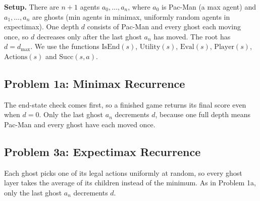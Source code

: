 \documentclass[11pt,a4paper]{article}
\begin{document}
\noindent\textbf{Setup.} There are $n+1$ agents $a_0, \dots, a_n$, where $a_0$ is Pac-Man (a max agent) and $a_1, \dots, a_n$ are ghosts (min agents in minimax, uniformly random agents in expectimax). One depth $d$ consists of Pac-Man and every ghost each moving once, so $d$ decreases only after the last ghost $a_n$ has moved. The root has $d = d_{\max}$. We use the functions $\text{IsEnd}(s)$, $\text{Utility}(s)$, $\text{Eval}(s)$, $\text{Player}(s)$, $\text{Actions}(s)$ and $\text{Succ}(s,a)$.

\subsection{Problem 1a: Minimax Recurrence}
\begin{center}
\end{center}
The end-state check comes first, so a finished game returns its final score even when $d = 0$. Only the last ghost $a_n$ decrements $d$, because one full depth means Pac-Man and every ghost have each moved once.

\subsection{Problem 3a: Expectimax Recurrence}
\begin{center}
\end{center}
Each ghost picks one of its legal actions uniformly at random, so every ghost layer takes the average of its children instead of the minimum. As in Problem 1a, only the last ghost $a_n$ decrements $d$.
\end{document}
